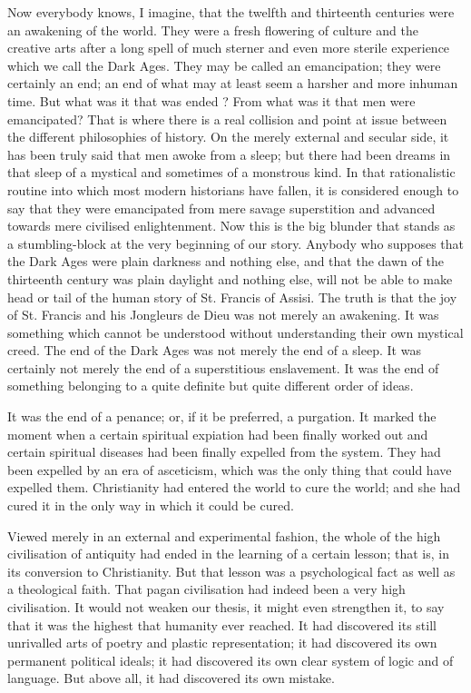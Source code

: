 \documentclass{book}
\begin{document}
Now everybody knows, I imagine, that the twelfth and thirteenth centuries were an awakening of the world. They were a fresh flowering of culture and the creative arts after a long spell of much sterner and even more sterile experience which we call the Dark Ages. They may be called an emancipation; they were certainly an end; an end of what may at least seem a harsher and more inhuman time. But what was it that was ended ? From what was it that men were emancipated? That is where there is a real collision and point at issue between the different philosophies of history. On the merely external and secular side, it has been truly said that men awoke from a sleep; but there had been dreams in that sleep of a mystical and sometimes of a monstrous kind. In that rationalistic routine into which most modern historians have fallen, it is considered enough to say that they were emancipated from mere savage superstition and advanced towards mere civilised enlightenment. Now this is the big blunder that stands as a stumbling-block at the very beginning of our story. Anybody who supposes that the Dark Ages were plain darkness and nothing else, and that the dawn of the thirteenth century was plain daylight and nothing else, will not be able to make head or tail of the human story of St. Francis of Assisi. The truth is that the joy of St. Francis and his Jongleurs de Dieu was not merely an awakening. It was something which cannot be understood without understanding their own mystical creed. The end of the Dark Ages was not merely the end of a sleep. It was certainly not merely the end of a superstitious enslavement. It was the end of something belonging to a quite definite but quite different order of ideas.

It was the end of a penance; or, if it be preferred, a purgation. It marked the moment when a certain spiritual expiation had been finally worked out and certain spiritual diseases had been finally expelled from the system. They had been expelled by an era of asceticism, which was the only thing that could have expelled them. Christianity had entered the world to cure the world; and she had cured it in the only way in which it could be cured.

Viewed merely in an external and experimental fashion, the whole of the high civilisation of antiquity had ended in the learning of a certain lesson; that is, in its conversion to Christianity. But that lesson was a psychological fact as well as a theological faith. That pagan civilisation had indeed been a very high civilisation. It would not weaken our thesis, it might even strengthen it, to say that it was the highest that humanity ever reached. It had discovered its still unrivalled arts of poetry and plastic representation; it had discovered its own permanent political ideals; it had discovered its own clear system of logic and of language. But above all, it had discovered its own mistake.
\end{document}
